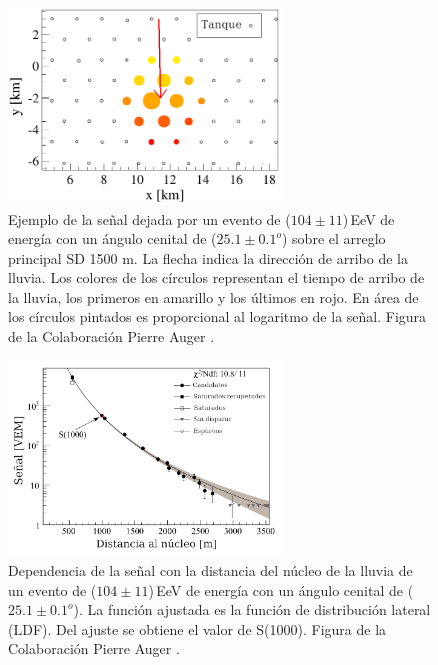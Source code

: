 \begin{figure}[H]
	\begin{small}
		\begin{center}
			\includegraphics[width=0.65\textwidth]{evento_sd.png}
		\end{center}
		\caption{Ejemplo de la señal dejada por un evento de ($104\pm11$)\,EeV de energía con un ángulo cenital de ($25.1\pm0.1 ^o$) sobre el arreglo principal SD 1500 m. La flecha indica la dirección de arribo de la lluvia. Los colores de los círculos representan el tiempo de arribo de la lluvia, los primeros en amarillo y los últimos en rojo. En área de los círculos pintados es proporcional al logaritmo de la señal. Figura de la Colaboración Pierre Auger \cite{como_funciona_auger}. } 	\label{fig:evento_sd}
	\end{small}
\end{figure}
\begin{figure}[H]
	\begin{small}
		\begin{center}
			\includegraphics[width=0.65\textwidth]{evento_s1000.png}
		\end{center}
		\caption{Dependencia de la señal con la distancia del núcleo de la lluvia de un evento de ($104\pm11$)\,EeV de energía con un ángulo cenital de ($25.1\pm0.1 ^o$). La función ajustada es la función de distribución lateral (LDF). Del ajuste se obtiene el valor de S(1000). Figura de la Colaboración Pierre Auger \cite{como_funciona_auger}. } 	\label{fig:evento_S1000}
	\end{small}
\end{figure}

